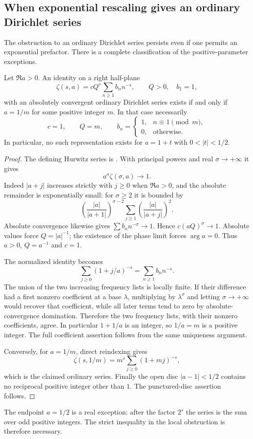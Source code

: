 \subsection{When exponential rescaling gives an ordinary Dirichlet series}\label{sec:rescaled-hurwitz}

The obstruction to an ordinary Dirichlet series persists even if one permits an exponential prefactor. There is a complete classification of the positive-parameter exceptions.

\begin{proposition}\label{prop:rescaled-hurwitz}
Let $\Re a>0$. An identity on a right half-plane
\[
 \zeta(s,a)=cQ^s\sum_{n\ge1}b_n n^{-s},\qquad Q>0,
 \quad b_1=1,
\]
with an absolutely convergent ordinary Dirichlet series exists if and only if $a=1/m$ for some positive integer $m$. In that case necessarily
\[
 c=1,\qquad Q=m,\qquad
 b_n=\begin{cases}1,&n\equiv1\pmod m,\\0,&\text{otherwise}.
 \end{cases}
\]
In particular, no such representation exists for $a=1+t$ with $0<|t|<1/2$.
\end{proposition}

\begin{proof}
The defining Hurwitz series is \citet[equation~25.11.1]{DLMFShift}. With principal powers and real $\sigma\to+\infty$ it gives
\[
 a^\sigma\zeta(\sigma,a)\longrightarrow1.
\]
Indeed $|a+j|$ increases strictly with $j\ge0$ when $\Re a>0$, and the absolute remainder is exponentially small: for $\sigma\ge2$ it is bounded by
\[
 \left(\frac{|a|}{|a+1|}\right)^{\sigma-2}
 \sum_{j\ge1}\left(\frac{|a|}{|a+j|}\right)^2.
\]
Absolute convergence likewise gives $\sum b_n n^{-\sigma}\to1$. Hence $c(aQ)^\sigma\to1$. Absolute values force $Q=|a|^{-1}$; the existence of the phase limit forces $\arg a=0$. Thus $a>0$, $Q=a^{-1}$ and $c=1$.

The normalized identity becomes
\[
 \sum_{j\ge0}(1+j/a)^{-s}=\sum_{n\ge1}b_n n^{-s}.
\]
The union of the two increasing frequency lists is locally finite. If their difference had a first nonzero coefficient at a base $\lambda$, multiplying by $\lambda^\sigma$ and letting $\sigma\to+\infty$ would recover that coefficient, while all later terms tend to zero by absolute-convergence domination. Therefore the two frequency lists, with their nonzero coefficients, agree. In particular $1+1/a$ is an integer, so $1/a=m$ is a positive integer. The full coefficient assertion follows from the same uniqueness argument.

Conversely, for $a=1/m$, direct reindexing gives
\[
 \zeta(s,1/m)=m^s\sum_{j\ge0}(1+mj)^{-s},
\]
which is the claimed ordinary series. Finally the open disc $|a-1|<1/2$ contains no reciprocal positive integer other than $1$. The punctured-disc assertion follows.
\end{proof}

The endpoint $a=1/2$ is a real exception: after the factor $2^s$ the series is the sum over odd positive integers. The strict inequality in the local obstruction is therefore necessary.
